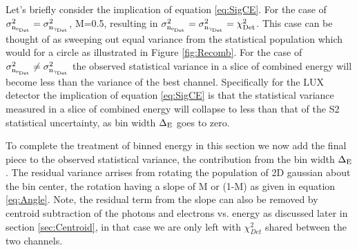 Let's briefly consider the implication of equation \ref{eq:SigCE}. For the case of $\rm \sigma_{n_{e_{Det}}}^2 = \sigma_{n_{\gamma_{Det}}}^2$, M=0.5, resulting in $\rm \sigma_{n_{e_{Det}}}^2=\sigma_{n_{\gamma_{Det}}}^2= \chi_{Det}^2$. This case can be thought of as sweeping out equal variance from the statistical population which would for a circle as illustrated in Figure \ref{fig:Recomb}. For the case of $\rm \sigma_{n_{e_{Det}}}^2 \neq \sigma_{n_{\gamma_{Det}}}^2$ the observed statistical variance in a slice of combined energy will become less than the variance of the best channel. Specifically for the LUX detector the implication of equation \ref{eq:SigCE} is that the statistical variance measured in a slice of combined energy will collapse to less than that of the S2 statistical uncertainty, as bin width $\rm \Delta_E$ goes to zero.


To complete the treatment of binned energy in this section we now add the final piece to the observed statistical variance, the contribution from the bin width $\rm \Delta_E$. The residual variance arrises from rotating the population of 2D gaussian about the bin center, the rotation having a slope of M or (1-M) as given in equation \ref{eq:Angle}. Note, the residual term from the slope can also be removed by centroid subtraction of the photons and electrons vs. energy as discussed later in section \ref{sec:Centroid}, in that case we are only left with $\chi_{Det}^2$ shared between the two channels.


